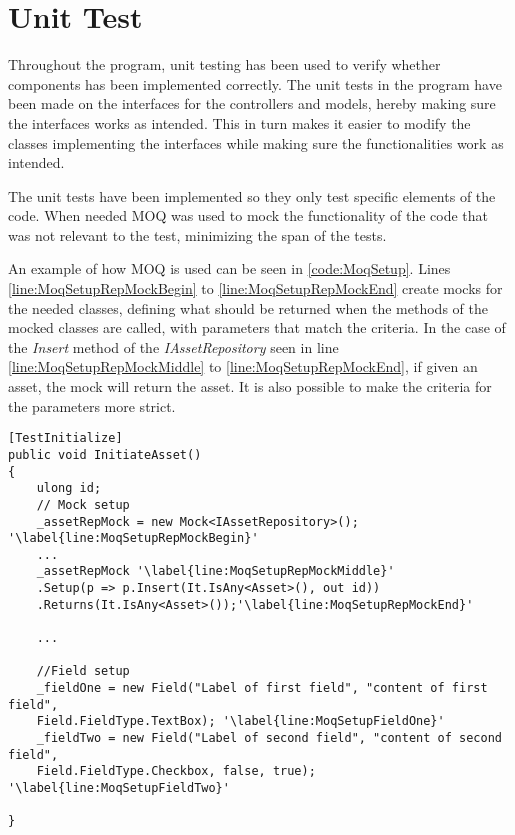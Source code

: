 \section{Unit Test} \label{sc:UnitTest}
Throughout the program, unit testing has been used to verify whether components has been implemented correctly. The unit tests in the program have been made on the interfaces for the controllers and models, hereby making sure the interfaces works as intended. This in turn makes it easier to modify the classes implementing the interfaces while making sure the functionalities work as intended. 
\par
The unit tests have been implemented so they only test specific elements of the code. When needed MOQ \citep{MoqReference} was used to mock the functionality of the code that was not relevant to the test, minimizing the span of the tests. 
\par
An example of how MOQ is used can be seen in \autoref{code:MoqSetup}. Lines \ref{line:MoqSetupRepMockBegin} to \ref{line:MoqSetupRepMockEnd} create mocks for the needed classes, defining what should be returned when the methods of the mocked classes are called, with parameters that match the criteria. In the case of the \textit{Insert} method of the \textit{IAssetRepository} seen in line \ref{line:MoqSetupRepMockMiddle} to \ref{line:MoqSetupRepMockEnd}, if given an asset, the mock will return the asset. It is also possible to make the criteria for the parameters more strict.

\begin{listing}[H]
\begin{verbatim}
[TestInitialize]
public void InitiateAsset()
{
    ulong id;
    // Mock setup
    _assetRepMock = new Mock<IAssetRepository>(); '\label{line:MoqSetupRepMockBegin}'
    ...
    _assetRepMock '\label{line:MoqSetupRepMockMiddle}'
    .Setup(p => p.Insert(It.IsAny<Asset>(), out id))
    .Returns(It.IsAny<Asset>());'\label{line:MoqSetupRepMockEnd}'
    
    ...
    
    //Field setup
    _fieldOne = new Field("Label of first field", "content of first field",
    Field.FieldType.TextBox); '\label{line:MoqSetupFieldOne}'
    _fieldTwo = new Field("Label of second field", "content of second field",
    Field.FieldType.Checkbox, false, true); '\label{line:MoqSetupFieldTwo}'
    
}
\end{verbatim}
\label{code:MoqSetup}
\end{listing}

